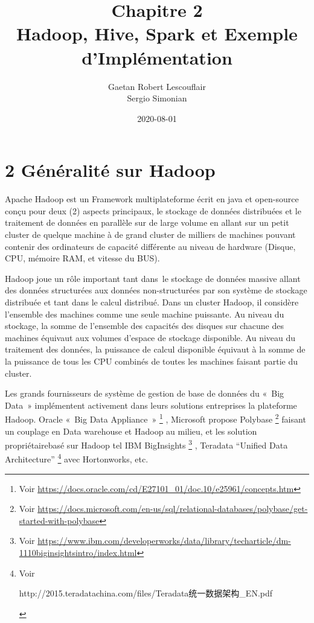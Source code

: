 \documentclass[12pt,french]{book}
\title{
	Chapitre 2\\
	Hadoop, Hive, Spark et Exemple d'Implémentation}
\date{2020-08-01}
\author{Gaetan Robert Lescouflair \\
	Sergio Simonian}
\begin{document}
	\maketitle
	\newpage
	\setcounter{chapter}{2}
	\setcounter{secnumdepth}{3}	
	\section*{2 Généralité sur Hadoop}

Apache Hadoop est un Framework multiplateforme écrit en java et open-source conçu pour deux (2) aspects principaux, le stockage de données distribuées et le traitement de données en parallèle sur de large volume en allant sur un petit cluster de quelque machine à de grand cluster de milliers de machines pouvant contenir des ordinateurs de capacité différente au niveau de hardware (Disque, CPU, mémoire RAM, et vitesse du BUS).
 
Hadoop joue un rôle important tant dans le stockage de données massive allant des données structurées aux données non-structurées par son système de stockage distribuée et tant dans le calcul distribué.  Dans un cluster Hadoop, il considère l’ensemble des machines comme une seule machine puissante. Au niveau du stockage, la somme de l’ensemble des capacités des disques sur chacune des machines équivaut aux volumes d’espace de stockage disponible. Au niveau du traitement des données, la puissance de calcul disponible équivaut à la somme de la puissance de tous les CPU combinés de toutes les machines faisant partie du cluster.

Les grands fournisseurs de système de gestion de base de données du « Big Data » implémentent activement dans leurs solutions entreprises la plateforme Hadoop.
Oracle « Big Data Appliance »
	\footnote{Voir \url{https://docs.oracle.com/cd/E27101\_01/doc.10/e25961/concepts.htm}}
, Microsoft propose Polybase 
	\footnote{Voir \url{https://docs.microsoft.com/en-us/sql/relational-databases/polybase/get-started-with-polybase}}
faisant un couplage en Data warehouse et Hadoop au milieu, et les solution propriétairebasé sur Hadoop tel IBM BigInsights 
	\footnote{Voir \url{https://www.ibm.com/developerworks/data/library/techarticle/dm-1110biginsightsintro/index.html}}
, Teradata “Unified Data Architecture” 
	\footnote{Voir 
		\begin{CJK*}{UTF8}{gbsn}
			http://2015.teradatachina.com/files/Teradata统一数据架构\_EN.pdf
		\end{CJK*}
	}
avec Hortonworks, etc.
\end{document}
